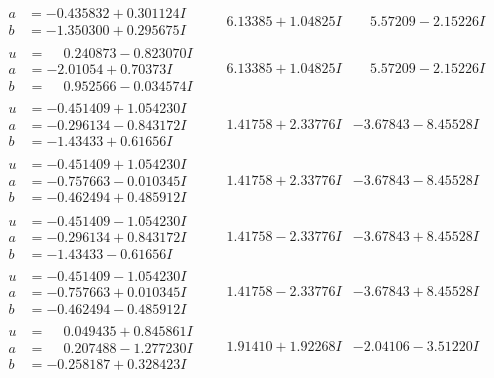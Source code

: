 \documentclass[1p]{elsarticle_modified}
\theoremstyle{definition}
\begin{document}
$$\begin{array}{c|c|c}
\begin{aligned}
a &= -0.435832 + 0.301124 I \\
b &= -1.350300 + 0.295675 I\end{aligned}
 & \phantom{-}6.13385 + 1.04825 I & \phantom{-}5.57209 - 2.15226 I \\ \hline\begin{aligned}
u &= \phantom{-}0.240873 - 0.823070 I \\
a &= -2.01054 + 0.70373 I \\
b &= \phantom{-}0.952566 - 0.034574 I\end{aligned}
 & \phantom{-}6.13385 + 1.04825 I & \phantom{-}5.57209 - 2.15226 I \\ \hline\begin{aligned}
u &= -0.451409 + 1.054230 I \\
a &= -0.296134 - 0.843172 I \\
b &= -1.43433 + 0.61656 I\end{aligned}
 & \phantom{-}1.41758 + 2.33776 I & -3.67843 - 8.45528 I \\ \hline\begin{aligned}
u &= -0.451409 + 1.054230 I \\
a &= -0.757663 - 0.010345 I \\
b &= -0.462494 + 0.485912 I\end{aligned}
 & \phantom{-}1.41758 + 2.33776 I & -3.67843 - 8.45528 I \\ \hline\begin{aligned}
u &= -0.451409 - 1.054230 I \\
a &= -0.296134 + 0.843172 I \\
b &= -1.43433 - 0.61656 I\end{aligned}
 & \phantom{-}1.41758 - 2.33776 I & -3.67843 + 8.45528 I \\ \hline\begin{aligned}
u &= -0.451409 - 1.054230 I \\
a &= -0.757663 + 0.010345 I \\
b &= -0.462494 - 0.485912 I\end{aligned}
 & \phantom{-}1.41758 - 2.33776 I & -3.67843 + 8.45528 I \\ \hline\begin{aligned}
u &= \phantom{-}0.049435 + 0.845861 I \\
a &= \phantom{-}0.207488 - 1.277230 I \\
b &= -0.258187 + 0.328423 I\end{aligned}
 & \phantom{-}1.91410 + 1.92268 I & -2.04106 - 3.51220 I \\ \hline\begin{aligned}

\end{aligned}
\end{array}$$
\end{document}
